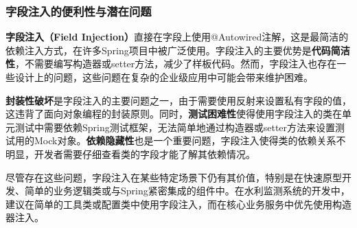 \subsubsection{字段注入的便利性与潜在问题}\label{ux5b57ux6bb5ux6ce8ux5165ux7684ux4fbfux5229ux6027ux4e0eux6f5cux5728ux95eeux9898}

\textbf{字段注入（Field Injection）}直接在字段上使用@Autowired注解，这是最简洁的依赖注入方式，在许多Spring项目中被广泛使用。字段注入的主要优势是\textbf{代码简洁性}，不需要编写构造器或setter方法，减少了样板代码。然而，字段注入也存在一些设计上的问题，这些问题在复杂的企业级应用中可能会带来维护困难。

\textbf{封装性破坏}是字段注入的主要问题之一，由于需要使用反射来设置私有字段的值，这违背了面向对象编程的封装原则。同时，\textbf{测试困难性}使得使用字段注入的类在单元测试中需要依赖Spring测试框架，无法简单地通过构造器或setter方法来设置测试用的Mock对象。\textbf{依赖隐藏性}也是一个重要问题，字段注入使得类的依赖关系不明显，开发者需要仔细查看类的字段才能了解其依赖情况。

尽管存在这些问题，字段注入在某些特定场景下仍有其价值，特别是在快速原型开发、简单的业务逻辑类或与Spring紧密集成的组件中。在水利监测系统的开发中，建议在简单的工具类或配置类中使用字段注入，而在核心业务服务中优先使用构造器注入。

